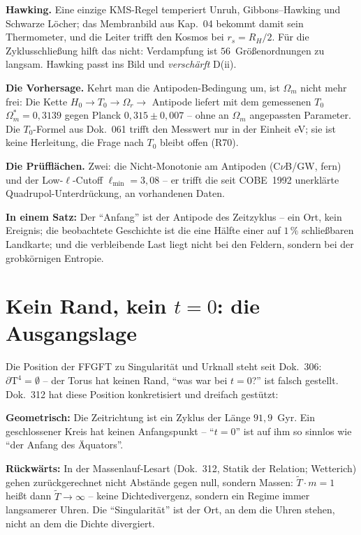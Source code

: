 \textbf{Hawking.} Eine einzige KMS-Regel temperiert Unruh,
Gibbons--Hawking und Schwarze Löcher; das Membranbild aus
Kap.~04 bekommt damit sein Thermometer, und die Leiter trifft den
Kosmos bei $r_s = R_H/2$. Für die Zyklusschließung hilft das
nicht: Verdampfung ist $56$~Größenordnungen zu langsam. Hawking
passt ins Bild und \emph{verschärft} D(ii).

\textbf{Die Vorhersage.} Kehrt man die Antipoden-Bedingung um,
ist $\Omega_m$ nicht mehr frei: Die Kette
$H_0 \to T_0 \to \Omega_r \to$ Antipode liefert mit dem
gemessenen $T_0$ $\Omega_m^{*} = 0{,}3139$ gegen Planck
$0{,}315\pm0{,}007$ -- ohne an $\Omega_m$ angepassten Parameter.
Die $T_0$-Formel aus Dok.~061 trifft den Messwert nur in der
Einheit eV; sie ist keine Herleitung, die Frage nach $T_0$ bleibt
offen (R70).

\textbf{Die Prüfflächen.} Zwei: die Nicht-Monotonie am Antipoden
(C$\nu$B/GW, fern) und der Low-$\ell$-Cutoff
$\ell_\text{min} = 3{,}08$ -- er trifft die seit COBE~1992
unerklärte Quadrupol-Unterdrückung, an vorhandenen Daten.

\medskip
\noindent\textbf{In einem Satz:} Der \enquote{Anfang} ist der
Antipode des Zeitzyklus -- ein Ort, kein Ereignis; die beobachtete
Geschichte ist die eine Hälfte einer auf $1\,\%$ schließbaren
Landkarte; und die verbleibende Last liegt nicht bei den Feldern,
sondern bei der grobkörnigen Entropie.

\chapter{Kein Rand, kein $t=0$: die Ausgangslage}

Die Position der FFGFT zu Singularität und Urknall steht seit
Dok.~306: $\partial\text{T}^4 = \emptyset$ -- der Torus hat keinen
Rand, \enquote{was war bei $t=0$?} ist falsch gestellt. Dok.~312
hat diese Position konkretisiert und dreifach gestützt:

\textbf{Geometrisch:} Die Zeitrichtung ist ein Zyklus der Länge
$91{,}9$~Gyr. Ein geschlossener Kreis hat keinen Anfangspunkt --
\enquote{$t=0$} ist auf ihm so sinnlos wie \enquote{der Anfang des
Äquators}.

\textbf{Rückwärts:} In der Massenlauf-Lesart (Dok.~312, Statik der
Relation; Wetterich) gehen zurückgerechnet nicht Abstände gegen
null, sondern Massen: $\tilde T \cdot m = 1$ heißt dann
$\tilde T \to \infty$ -- keine Dichtedivergenz, sondern ein Regime
immer langsamerer Uhren. Die \enquote{Singularität} ist der Ort,
an dem die Uhren stehen, nicht an dem die Dichte divergiert.


